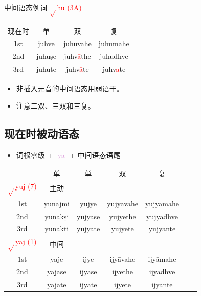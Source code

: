 \documentclass[17pt]{beamer}
\newcommand{\verbroot}[1]{\textcolor{red}{$\sqrt{}$#1}}
\newcommand{\fullpada}[1]{\textcolor{OliveGreen}{#1}}
\newcommand{\pratyaya}[1]{\textcolor{Plum}{#1}}
\newcommand{\veryimportant}[1]{\textcolor{red}{#1}}
\begin{document}
\begin{frame}{中间语态例词 \verbroot{hu (3Ā)}}
  \centering
  \begin{tabular}{@{}cccc@{}} %
    现在时 & 单 & 双 & 复  \\
    1st & \fullpada{juhve} & \fullpada{juhuvahe}  & \fullpada{juhumahe}  \\
    2nd & \fullpada{juhuṣe} & \fullpada{juhv\veryimportant{ā}the} & \fullpada{juhudhve}   \\
    3rd & \fullpada{juhute} & \fullpada{juhv\veryimportant{ā}te} & \fullpada{juhv\veryimportant{a}te}  \\
  \end{tabular}
  \begin{itemize}
      \item 非插入元音的中间语态用弱语干。
      \item 注意二双、三双和三复。
  \end{itemize}  
\end{frame}

\subsection{现在时被动语态}
\begin{frame}{\insertsubsection}
  \begin{itemize}
    \item
      词根零级 + \pratyaya{\nobreakdash-ya\nobreakdash-} + 中间语态语尾   
  \end{itemize}
  \small
  \centering
  \begin{NiceTabular}{@{}ccccccc@{}} %
     & 单 & 单 & 双 & 复 \\
    \verbroot{yuj (7)} & 主动 &  \\
    1st & \fullpada{yunajmi}  & \fullpada{yujye} & \fullpada{yujyāvahe}  & \fullpada{yujyāmahe}  \\
    2nd & \fullpada{yunakṣi}  & \fullpada{yujyase} & \fullpada{yujyethe} & \fullpada{yujyadhve}   \\
    3rd & \fullpada{yunakti}  & \fullpada{yujyate} & \fullpada{yujyete} & \fullpada{yujyante}  \\
    \verbroot{yaj (1)} & 中间 &  \\
    1st & \fullpada{yaje}  & \fullpada{ijye} & \fullpada{ijyāvahe}  & \fullpada{ijyāmahe}  \\
    2nd & \fullpada{yajase}  & \fullpada{ijyase} & \fullpada{ijyethe} & \fullpada{ijyadhve}   \\
    3rd & \fullpada{yajate}  & \fullpada{ijyate} & \fullpada{ijyete} & \fullpada{ijyante}  \\
  \end{NiceTabular}
\end{frame}
\end{document}
